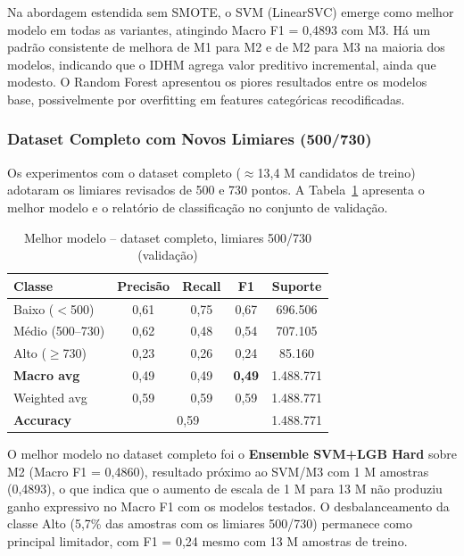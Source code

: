 \documentclass[12pt]{article}
\begin{document}
Na abordagem estendida sem SMOTE, o SVM (LinearSVC) emerge como melhor
modelo em todas as variantes, atingindo Macro F1 = 0,4893 com M3. Há
um padrão consistente de melhora de M1 para M2 e de M2 para M3 na
maioria dos modelos, indicando que o IDHM agrega valor preditivo
incremental, ainda que modesto. O Random Forest apresentou os piores
resultados entre os modelos base, possivelmente por overfitting em
features categóricas recodificadas.

\subsubsection{Dataset Completo com Novos Limiares (500/730)}

Os experimentos com o dataset completo ($\approx$13,4 M candidatos de
treino) adotaram os limiares revisados de 500 e 730 pontos. A
Tabela~\ref{tab:resultados_full} apresenta o melhor modelo e o relatório
de classificação no conjunto de validação.

\begin{table}[H]
\centering
\caption{Melhor modelo -- dataset completo, limiares 500/730 (validação)}
\label{tab:resultados_full}
\small
\begin{tabular}{lcccc}
\toprule
\textbf{Classe} & \textbf{Precisão} & \textbf{Recall} & \textbf{F1} & \textbf{Suporte} \\
\midrule
Baixo ($<$500)       & 0,61 & 0,75 & 0,67 & 696.506 \\
Médio (500--730)     & 0,62 & 0,48 & 0,54 & 707.105 \\
Alto ($\geq$730)     & 0,23 & 0,26 & 0,24 &  85.160 \\
\midrule
\textbf{Macro avg}   & 0,49 & 0,49 & \textbf{0,49} & 1.488.771 \\
Weighted avg         & 0,59 & 0,59 & 0,59 & 1.488.771 \\
\textbf{Accuracy}    & \multicolumn{3}{c}{0,59} & 1.488.771 \\
\bottomrule
\end{tabular}
\end{table}

O melhor modelo no dataset completo foi o \textbf{Ensemble SVM+LGB Hard}
sobre M2 (Macro F1 = 0,4860), resultado próximo ao SVM/M3 com 1 M
amostras (0,4893), o que indica que o aumento de escala de 1 M para 13 M
não produziu ganho expressivo no Macro F1 com os modelos testados. O
desbalanceamento da classe Alto (5,7\% das amostras com os limiares
500/730) permanece como principal limitador, com F1 = 0,24 mesmo com 13 M
amostras de treino.
\end{document}
